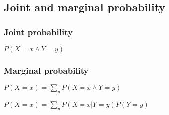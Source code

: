 
\subsection{Joint and marginal probability}

\subsubsection{Joint probability}

\(P(X=x\land Y=y)\)

\subsubsection{ Marginal probability}

\(P(X=x)=\sum_{y}P(X=x\land Y=y)\)

\(P(X=x)=\sum_{y}P(X=x|Y=y)P(Y=y)\)


